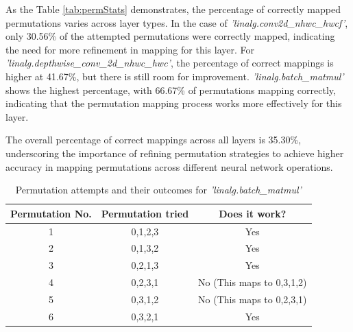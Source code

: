 \begin{table}[h]
\caption{Statistics of Permutation Mapping for Different Layer Types}
\label{tab:permStats}
\centering
{}
\end{table}

As the Table \ref{tab:permStats} demonstrates, the percentage of correctly mapped permutations varies across layer types. In the case of \textit{'linalg.conv2d\_nhwc\_hwcf'}, only 30.56\% of the attempted permutations were correctly mapped, indicating the need for more refinement in mapping for this layer. For \textit{'linalg.depthwise\_conv\_2d\_nhwc\_hwc'}, the percentage of correct mappings is higher at 41.67\%, but there is still room for improvement. \textit{'linalg.batch\_matmul'} shows the highest percentage, with 66.67\% of permutations mapping correctly, indicating that the permutation mapping process works more effectively for this layer.

The overall percentage of correct mappings across all layers is 35.30\%, underscoring the importance of refining permutation strategies to achieve higher accuracy in mapping permutations across different neural network operations.

\begin{table}[H]
\caption{Permutation attempts and their outcomes for \textit{'linalg.batch\_matmul'}}
\label{tab:matmulPermutation}
\centering
\begin{tabular}{|c|c|c|}
\hline
\textbf{Permutation No.} & \textbf{Permutation tried} & \textbf{Does it work?} \\ \hline
1 & 0,1,2,3 & Yes \\ \hline
2 & 0,1,3,2 & Yes \\ \hline
3 & 0,2,1,3 & Yes \\ \hline
4 & 0,2,3,1 & No (This maps to 0,3,1,2) \\ \hline
5 & 0,3,1,2 & No (This maps to 0,2,3,1) \\ \hline
6 & 0,3,2,1 & Yes \\ \hline
\end{tabular}%
\end{table}


